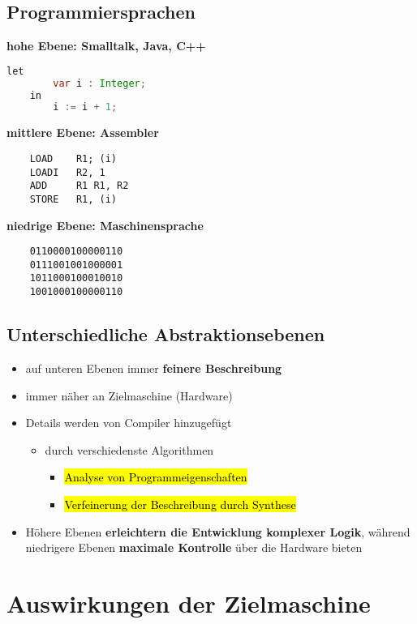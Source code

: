 \documentclass[a4paper, 10pt]{article}
\begin{document}
\subsection{Programmiersprachen}
\textbf{hohe Ebene: Smalltalk, Java, C++}
\begin{lstlisting}[language=Java]
    let
        var i : Integer;
    in
        i := i + 1;
\end{lstlisting}

\noindent\textbf{mittlere Ebene: Assembler}
\begin{lstlisting}
    LOAD    R1; (i)
    LOADI   R2, 1
    ADD     R1 R1, R2
    STORE   R1, (i)
\end{lstlisting}
\textbf{niedrige Ebene: Maschinensprache}
\begin{lstlisting}
    0110000100000110
    0111001001000001 
    1011000100010010 
    1001000100000110
\end{lstlisting}

\subsection{Unterschiedliche Abstraktionsebenen}
\begin{itemize}
    \item auf unteren Ebenen immer \textbf{feinere Beschreibung}
    \item immer näher an Zielmaschine (Hardware)
    \item Details werden von Compiler hinzugefügt
    \begin{itemize}
        \item durch verschiedenste Algorithmen
        \begin{itemize}
            \item \hl{Analyse von Programmeigenschaften}
            \item \hl{Verfeinerung der Beschreibung durch Synthese}
        \end{itemize}
    \end{itemize}
    \item Höhere Ebenen \textbf{erleichtern die Entwicklung komplexer Logik}, während niedrigere Ebenen \textbf{maximale Kontrolle} über die Hardware bieten
\end{itemize}
\section{Auswirkungen der Zielmaschine}
\end{document}
